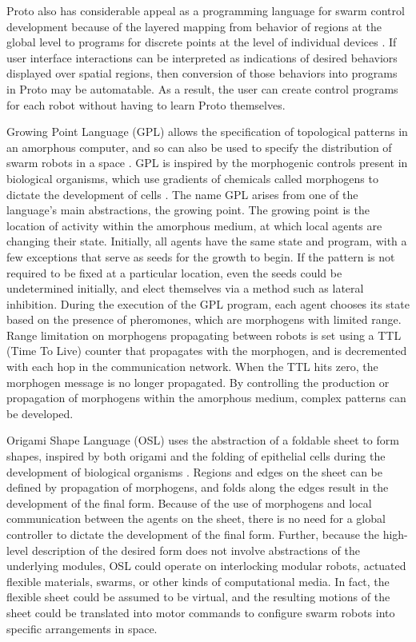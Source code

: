\documentclass[]{article}
\begin{document}
Proto also has considerable appeal as a programming language for swarm control development because of the layered mapping from behavior of regions at the global level to programs for discrete points at the level of individual devices \cite{beal2006infrastructure}. 
If user interface interactions can be interpreted as indications of desired behaviors displayed over spatial regions, then conversion of those behaviors into programs in Proto may be automatable. 
As a result, the user can create control programs for each robot without having to learn Proto themselves.  

Growing Point Language (GPL) allows the specification of topological patterns in an amorphous computer, and so can also be used to specify the distribution of swarm robots in a space \cite{nagpal2004engineering}. 
GPL is inspired by the morphogenic controls present in biological organisms, which use gradients of chemicals called morphogens to dictate the development of cells \cite{turing1952chemical}.
The name GPL arises from one of the language's main abstractions, the growing point. 
The growing point is the location of activity within the amorphous medium, at which local agents are changing their state. 
Initially, all agents have the same state and program, with a few exceptions that serve as seeds for the growth to begin. 
If the pattern is not required to be fixed at a particular location, even the seeds could be undetermined initially, and elect themselves via a method such as lateral inhibition. 
During the execution of the GPL program, each agent chooses its state based on the presence of pheromones, which are morphogens with limited range. 
Range limitation on morphogens propagating between robots is set using a TTL (Time To Live) counter that propagates with the morphogen, and is decremented with each hop in the communication network. 
When the TTL hits zero, the morphogen message is no longer propagated. 
By controlling the production or propagation of morphogens within the amorphous medium, complex patterns can be developed. 

Origami Shape Language (OSL) uses the abstraction of a foldable sheet to form shapes, inspired by both origami and the folding of epithelial cells during the development of biological organisms \cite{nagpal2004engineering, nagpal2001programmable}.
Regions and edges on the sheet can be defined by propagation of morphogens, and folds along the edges result in the development of the final form.
Because of the use of morphogens and local communication between the agents on the sheet, there is no need for a global controller to dictate the development of the final form. 
Further, because the high-level description of the desired form does not involve abstractions of the underlying modules, OSL could operate on interlocking modular robots, actuated flexible materials, swarms, or other kinds of computational media. 
In fact, the flexible sheet could be assumed to be virtual, and the resulting motions of the sheet could be translated into motor commands to configure swarm robots into specific arrangements in space. 
\end{document}
